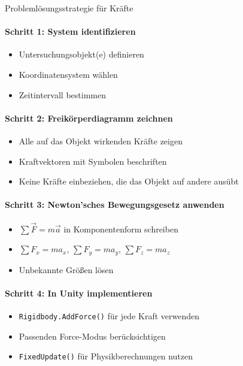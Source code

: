 \multend

\begin{KR}{Problemlösungsstrategie für Kräfte}
    \paragraph{Schritt 1: System identifizieren}
    \begin{itemize}
        \item Untersuchungsobjekt(e) definieren
        \item Koordinatensystem wählen
        \item Zeitintervall bestimmen
    \end{itemize}
    
    \paragraph{Schritt 2: Freikörperdiagramm zeichnen}
    \begin{itemize}
        \item Alle auf das Objekt wirkenden Kräfte zeigen
        \item Kraftvektoren mit Symbolen beschriften
        \item Keine Kräfte einbeziehen, die das Objekt auf andere ausübt
    \end{itemize}
    
    \paragraph{Schritt 3: Newton'sches Bewegungsgesetz anwenden}
    \begin{itemize}
        \item $\sum \vec{F} = m\vec{a}$ in Komponentenform schreiben
        \item $\sum F_x = ma_x$, $\sum F_y = ma_y$, $\sum F_z = ma_z$
        \item Unbekannte Größen lösen
    \end{itemize}
    
    \paragraph{Schritt 4: In Unity implementieren}
    \begin{itemize}
        \item \texttt{Rigidbody.AddForce()} für jede Kraft verwenden
        \item Passenden Force-Modus berücksichtigen
        \item \texttt{FixedUpdate()} für Physikberechnungen nutzen
    \end{itemize}
\end{KR}

